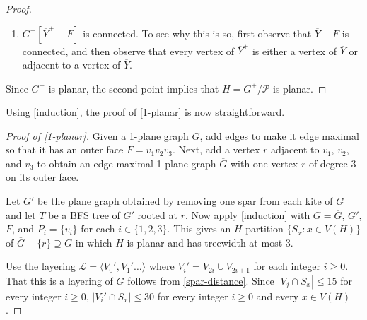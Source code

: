\documentclass{patmorin}
\DeclareMathOperator{\dist}{dist}
\DeclarePairedDelimiter{\floor}{\lfloor}{\rfloor}
\renewcommand{\ge}{\geqslant}
\renewcommand{\le}{\leqslant}
\begin{document}
\begin{proof}
\begin{enumerate}
    \item $G^+[\overline{Y}^+-F]$ is connected. To see why this is so, first observe that $\overline{Y}-F$ is connected, and then observe that every vertex of $\overline{Y}^+$ is either a vertex of $\overline{Y}$ or adjacent to a vertex of $\overline{Y}$.
  \end{enumerate}
  Since $G^+$ is planar, the second point implies that $H=G^+/\mathcal{P}$ is planar.
\end{proof}

Using \cref{induction}, the proof of \cref{1-planar} is now straightforward. 

\begin{proof}[Proof of \cref{1-planar}]
Given a 1-plane graph $G$, add edges to make it edge maximal so that it has an outer face $F=v_1v_2v_3$. Next, add a vertex $r$ adjacent to $v_1$, $v_2$, and $v_3$ to obtain an edge-maximal 1-plane graph $\overline{G}$ with one vertex $r$ of degree 3 on its outer face. 
  
  Let $G'$ be the plane graph obtained by removing one spar from each kite of $\overline{G}$ and let $T$ be a BFS tree of $G'$ rooted at $r$.  Now apply \cref{induction} with $G=\overline{G}$, $G'$, $F$, and $P_i=\{v_i\}$ for each $i\in\{1,2,3\}$.  This gives an $H$-partition $\{S_x:x\in V(H)\}$ of $\overline{G}-\{r\}\supseteq G$ in which $H$ is planar and has treewidth at most 3.
  
  Use the layering $\mathcal{L}=\langle V_0',V_1'\ldots\rangle$ where $V_i'=V_{2i}\cup V_{2i+1}$ for each integer $i\ge 0$. That this is a layering of $G$ follows from \eqref{spar-distance}.  Since $|V_j\cap S_x|\le 15$ for every integer $i\ge 0$, $|V_i'\cap S_x|\le 30$ for every integer $i\ge 0$ and every $x\in V(H)$.
\end{proof}

% 
\end{document}
